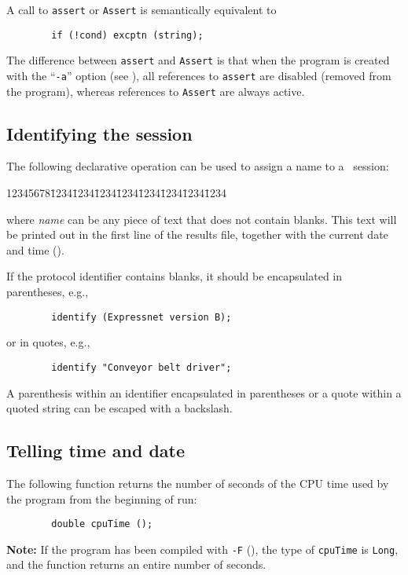 A call to {\tt assert} or {\tt Assert} is semantically equivalent to
\begin{verbatim}
        if (!cond) excptn (string);
\end{verbatim}
The difference between {\tt assert} and {\tt Assert} is that
when the program is created with the ``{\tt -a}'' option (see
), all references to {\tt assert} are disabled (removed
from the program), whereas references to {\tt Assert} are always
active.

\subsection{Identifying the session}
\label{rm_au_id}

The following declarative operation can be used to assign a name to
a \smurph\ session:
{\tt\begin{tabbing}
12345678\=1234\=1234\=1234\=1234\=1234\=1234\=1234\=1234\kill
{}
\end{tabbing}}
\noindent
where {\em name\/} can be any piece of text that does not contain blanks.
This text will be printed out in the first line of the results
file, together with the current date and time ().

If the protocol identifier contains blanks, it should be encapsulated in
parentheses, e.g.,
\begin{verbatim}
        identify (Expressnet version B);
\end{verbatim}
or in quotes, e.g.,
\begin{verbatim}
        identify "Conveyor belt driver";
\end{verbatim}

A parenthesis within an identifier encapsulated in parentheses
or a quote within a
quoted string can be escaped with a backslash.

\subsection{Telling time and date}
\label{rm_au_td}

The following function returns the number of seconds of the CPU time used
by the program from the beginning of run:
\begin{verbatim}
        double cpuTime ();
\end{verbatim}

\medskip

\noindent
{\bf Note:}
If the program has been compiled with {\tt -F} (),
the type of {\tt cpuTime} is {\tt Long}, and the function returns
an entire number of seconds.

